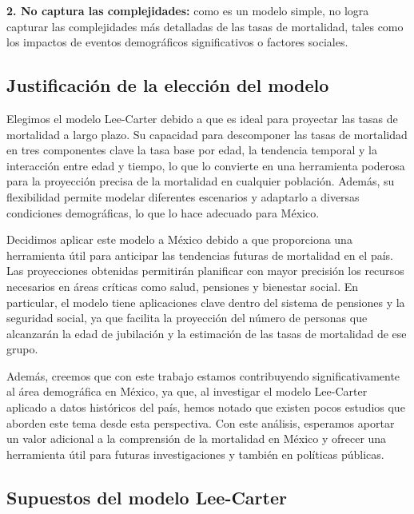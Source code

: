 \documentclass[
]{article}
\begin{document}
\textbf{2. No captura las complejidades:} como es un modelo simple, no
logra capturar las complejidades más detalladas de las tasas de
mortalidad, tales como los impactos de eventos demográficos
significativos o factores sociales.

\hypertarget{justificaciuxf3n-de-la-elecciuxf3n-del-modelo}{%
\subsection{Justificación de la elección del
modelo}\label{justificaciuxf3n-de-la-elecciuxf3n-del-modelo}}

Elegimos el modelo Lee-Carter debido a que es ideal para proyectar las
tasas de mortalidad a largo plazo. Su capacidad para descomponer las
tasas de mortalidad en tres componentes clave la tasa base por edad, la
tendencia temporal y la interacción entre edad y tiempo, lo que lo
convierte en una herramienta poderosa para la proyección precisa de la
mortalidad en cualquier población. Además, su flexibilidad permite
modelar diferentes escenarios y adaptarlo a diversas condiciones
demográficas, lo que lo hace adecuado para México.

Decidimos aplicar este modelo a México debido a que proporciona una
herramienta útil para anticipar las tendencias futuras de mortalidad en
el país. Las proyecciones obtenidas permitirán planificar con mayor
precisión los recursos necesarios en áreas críticas como salud,
pensiones y bienestar social. En particular, el modelo tiene
aplicaciones clave dentro del sistema de pensiones y la seguridad
social, ya que facilita la proyección del número de personas que
alcanzarán la edad de jubilación y la estimación de las tasas de
mortalidad de ese grupo.

Además, creemos que con este trabajo estamos contribuyendo
significativamente al área demográfica en México, ya que, al investigar
el modelo Lee-Carter aplicado a datos históricos del país, hemos notado
que existen pocos estudios que aborden este tema desde esta perspectiva.
Con este análisis, esperamos aportar un valor adicional a la comprensión
de la mortalidad en México y ofrecer una herramienta útil para futuras
investigaciones y también en políticas públicas.

\hypertarget{supuestos-del-modelo-lee-carter}{%
\subsection{Supuestos del modelo
Lee-Carter}\label{supuestos-del-modelo-lee-carter}}
\end{document}
